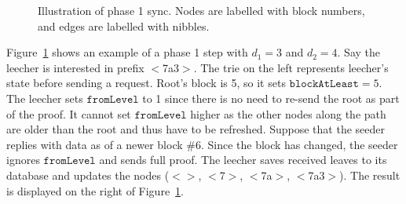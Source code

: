 \documentclass{amsart}
\begin{document}
\begin{figure}[h]
\caption{Illustration of phase 1 sync. Nodes are labelled with block numbers, and edges are labelled with nibbles.}
\label{fig:phase1_example}
\end{figure}

Figure~\ref{fig:phase1_example} shows an example of a phase 1 step with $d_1 = 3$ and $d_2 = 4$.
Say the leecher is interested in prefix $<$7a3$>$.
The trie on the left represents leecher's state before sending a request.
Root's block is 5, so it sets $\texttt{blockAtLeast} = 5$.
The leecher sets $\texttt{fromLevel}$ to 1 since there is no need to re-send the root as part of the proof.
It cannot set $\texttt{fromLevel}$ higher as the other nodes along the path are older than the root and thus have to be refreshed.
Suppose that the seeder replies with data as of a newer block \#6.
Since the block has changed, the seeder ignores $\texttt{fromLevel}$ and sends full proof.
The leecher saves received leaves to its database and updates the nodes  ($<>$, $<$7$>$, $<$7a$>$, $<$7a3$>$).
The result is displayed on the right of Figure~\ref{fig:phase1_example}.
\end{document}

